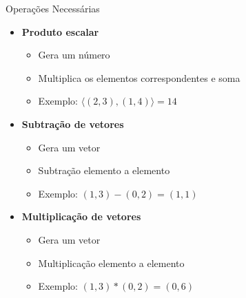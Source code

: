 \documentclass{beamer}
\begin{document}
\begin{frame}{Operações Necessárias}


\vspace{0.5cm}

\begin{itemize}

\item \textbf{Produto escalar}
\begin{itemize}
    \item Gera um número
    \item Multiplica os elementos correspondentes e soma
    \item Exemplo: $\langle (2,3),(1,4) \rangle = 14$
\end{itemize}

\vspace{0.4cm}

\item \textbf{Subtração de vetores}
\begin{itemize}
    \item Gera um vetor
    \item Subtração elemento a elemento
    \item Exemplo: $(1,3) - (0,2) = (1,1)$
\end{itemize}

\vspace{0.4cm}

\item \textbf{Multiplicação de vetores}
\begin{itemize}
    \item Gera um vetor
    \item Multiplicação elemento a elemento
    \item Exemplo: $(1,3) * (0,2) = (0,6)$
\end{itemize}

\end{itemize}

\end{frame}
\end{document}

